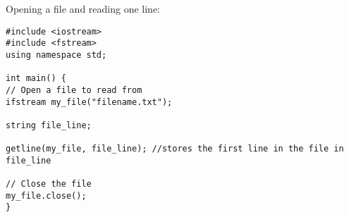 Opening a file and reading one line:

\begin{verbatim}
#include <iostream>
#include <fstream>
using namespace std;

int main() {
// Open a file to read from
ifstream my_file("filename.txt");

string file_line; 

getline(my_file, file_line); //stores the first line in the file in file_line

// Close the file
my_file.close();
}
\end{verbatim}

